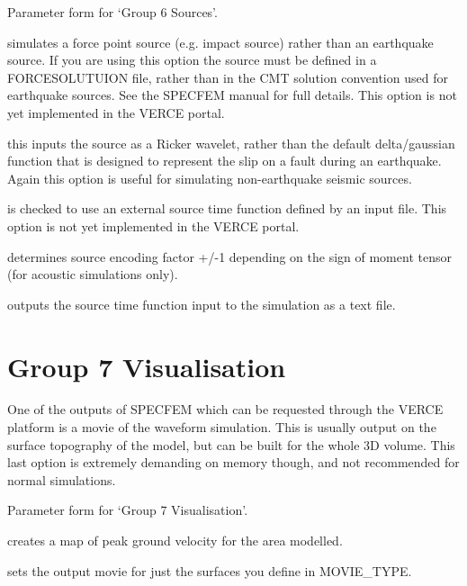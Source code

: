\documentclass[english]{book}
\begin{document}

 Parameter form for ‘Group 6 \textendash{} Sources’.

 simulates a force point source (e.g.
impact source) rather than an earthquake source. If you are using this
option the source must be defined in a FORCESOLUTUION file, rather than
in the CMT solution convention used for earthquake sources. See the
SPECFEM manual for full details. This option is not yet implemented in
the VERCE portal.

 this inputs the source as a Ricker
wavelet, rather than the default delta/gaussian function that is
designed to represent the slip on a fault during an earthquake. Again
this option is useful for simulating non-earthquake seismic sources.

 is checked to use an external source
time function defined by an input file. This option is not yet
implemented in the VERCE portal.

 determines source encoding factor +/-1
depending on the sign of moment tensor (for acoustic simulations only).

 outputs the source time function input
to the simulation as a text file.


\section{Group 7 \textendash{} Visualisation}
\label{\detokenize{Appendix1:a1-8-group-7-visualisation}}
One of the outputs of SPECFEM which can be requested through the VERCE
platform is a movie of the waveform simulation. This is usually output
on the surface topography of the model, but can be built for the whole
3D volume. This last option is extremely demanding on memory though, and
not recommended for normal simulations.


 Parameter form for ‘Group 7 \textendash{} Visualisation’.

 creates a map of peak ground velocity for the area
modelled.

 sets the output movie for just the surfaces you
define in MOVIE\_TYPE.
\end{document}
